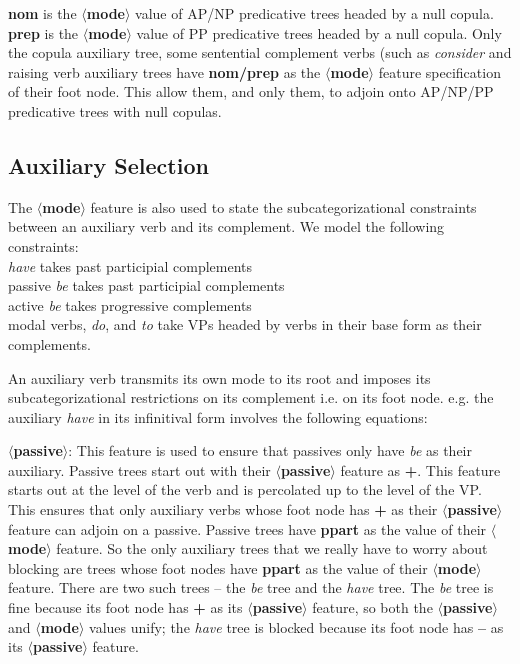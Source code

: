 \noindent
{\bf nom} is the {\bf $\langle$mode$\rangle$} value of AP/NP
predicative trees headed by a null copula.  {\bf prep} is the {\bf
$\langle$mode$\rangle$} value of PP predicative trees headed by a null
copula.  Only the copula auxiliary tree, some sentential complement
verbs (such as {\it consider} and raising verb auxiliary trees have
{\bf nom/prep} as the {\bf $\langle$mode$\rangle$} feature
specification of their foot node. This allow them, and only them, to
adjoin onto AP/NP/PP predicative trees with null copulas.

\subsection{Auxiliary Selection}
The {\bf $\langle$mode$\rangle$} feature is also used to state the
subcategorizational constraints between an auxiliary verb and its
complement. We model the following constraints:\\
{\em have} takes past participial complements\\
passive {\em be} takes past participial complements\\
active {\em be} takes progressive complements\\
modal verbs, {\em do}, and {\em to} take VPs headed by verbs in their
base form as their complements. 

An auxiliary verb transmits its own mode to its root and imposes its
subcategorizational restrictions on its complement i.e. on its foot node.
e.g. the auxiliary {\em have} in its infinitival form involves the
following equations:


\noindent
{\bf $\langle$passive$\rangle$}: This feature is used to ensure that
passives only have {\em be} as their auxiliary. Passive trees start
out with their {\bf $\langle$passive$\rangle$} feature as {\bf +}.
This feature starts out at the level of the verb and is percolated up
to the level of the VP. This ensures that only auxiliary verbs whose
foot node has {\bf +} as their {\bf $\langle$passive$\rangle$} feature
can adjoin on a passive. Passive trees have {\bf ppart} as the value
of their {\bf $\langle$mode$\rangle$} feature. So the only auxiliary
trees that we really have to worry about blocking are trees whose foot
nodes have {\bf ppart} as the value of their {\bf
$\langle$mode$\rangle$} feature. There are two such trees -- the {\em
be} tree and the {\em have} tree. The {\em be} tree is fine because
its foot node has {\bf +} as its {\bf $\langle$passive$\rangle$}
feature, so both the {\bf $\langle$passive$\rangle$} and {\bf
$\langle$mode$\rangle$} values unify; the {\em have} tree is blocked
because its foot node has {\bf --} as its {\bf
$\langle$passive$\rangle$} feature.



